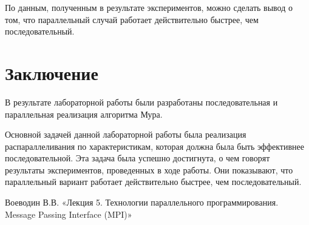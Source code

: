 \documentclass{report}
\begin{document}
\par По данным, полученным в результате экспериментов, можно сделать вывод о том, что параллельный случай работает действительно быстрее, чем последовательный. 

\newpage

\section*{Заключение}
В результате лабораторной работы были разработаны последовательная и параллельная реализация алгоритма Мура.
\par Основной задачей данной лабораторной работы была реализация распараллеливания по характеристикам, которая должна была быть эффективнее последовательной. Эта задача была успешно достигнута, о чем говорят результаты экспериментов, проведенных в ходе работы. Они показывают, что параллельный вариант работает действительно быстрее, чем последовательный.

\newpage

\begin{thebibliography}{1}

 Воеводин В.В. «Лекция 5. Технологии параллельного программирования.
Message Passing Interface (MPI)»

\end{thebibliography}
\newpage

\end{document}
